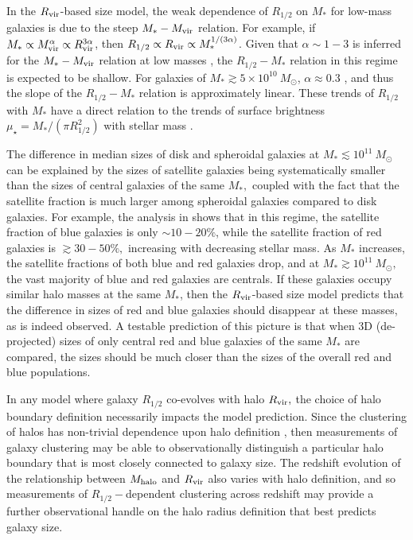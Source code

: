 \documentclass[usenatbib,usegraphicx,letterpaper]{mn2e}
\newcommand{\rhalf}{R_{1/2}}
\newcommand{\mstar}{M_{\ast}}
\newcommand{\mvir}{M_{\rm vir}}
\newcommand{\mhalo}{M_{\rm halo}}
\newcommand{\rvir}{R_{\rm vir}}
\begin{document}
In the $\rvir$-based size model, the weak dependence of $\rhalf$ on $\mstar$ for low-mass galaxies is due to the steep $\mstar-\mvir$ relation. For example, if $\mstar\propto\mvir^\alpha\propto\rvir^{3\alpha}$, then $\rhalf\propto \rvir\propto \mstar^{1/(3\alpha)}$. Given that $\alpha\sim 1-3$ is inferred for the $\mstar-\mvir$ relation at low masses \citep{kravtsov10,moster_etal13,behroozi13_smhm,kravtsov_etal14}, the $\rhalf-\mstar$ relation in this regime is expected to be shallow.
For galaxies of $\mstar\gtrsim 5\times 10^{10}\ M_\odot$, $\alpha\approx 0.3$ \citep[e.g.,][]{kravtsov_etal14}, and thus
the slope of the $\rhalf-\mstar$ relation is approximately linear. These trends of $\rhalf$ with $\mstar$ have a direct relation to the trends of surface brightness $\mu_\star=\mstar/(\pi\rhalf^2)$ with stellar mass \citep[see, for example, the $\mu_\star-$dependent clustering measurements in][which are qualitatively similar to the measurements reported here]{li_etal06}.

The difference in median sizes of disk and spheroidal galaxies at $\mstar\lesssim 10^{11}\ M_\odot$ can be explained by the sizes of satellite galaxies being systematically smaller than the sizes of central galaxies of the same $\mstar,$ coupled with the fact that the satellite fraction is much larger among spheroidal galaxies compared to disk galaxies. For example, the analysis in \citet{rodriguez_puebla_etal15} shows that in this regime, the satellite fraction of blue galaxies is only $\sim10-20\%$, while
the satellite fraction of red galaxies is $\gtrsim 30-50\%,$ increasing with decreasing stellar mass.
As $\mstar$ increases, the satellite fractions of both blue and red galaxies drop, and at $\mstar\gtrsim 10^{11}\ M_\odot,$ the vast majority of blue and red galaxies are centrals. If these galaxies occupy similar halo masses at the same $\mstar$, then the $\rvir$-based size model predicts that the difference in sizes of red and blue galaxies should disappear at these masses, as is indeed observed. A testable prediction of this picture is that when 3D (de-projected) sizes of only central red and blue galaxies of the same $\mstar$ are compared, the sizes should be much closer than the sizes of the overall red and blue populations.

In any model where galaxy $\rhalf$ co-evolves with halo $\rvir,$ the choice of halo boundary definition necessarily impacts the model prediction. Since the clustering of halos has non-trivial dependence upon halo definition \citep{villarreal_etal17}, then measurements of galaxy clustering may be able to observationally distinguish a particular halo boundary that is most closely connected to galaxy size. The redshift evolution of the relationship between $\mhalo$ and $\rvir$ also varies with halo definition, and so measurements of $\rhalf-$dependent clustering across redshift may provide a further observational handle on the halo radius definition that best predicts galaxy size. 
\end{document}
